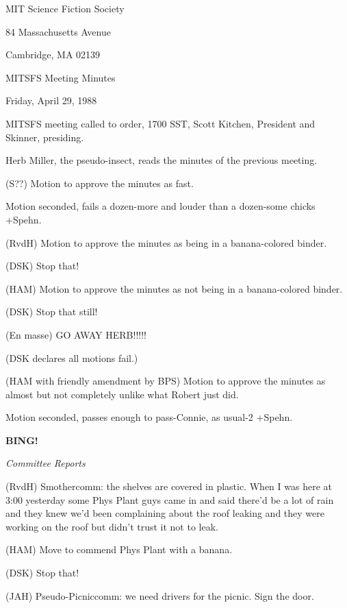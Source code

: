 \documentclass[12pt]{article}
\newcommand{\bing}{{\bf BING!} }
\newcommand{\goto}[1]{\bing \vskip 12pt \centerline{{\em{#1}}}}
\begin{document}
\begin{center}

MIT Science Fiction Society 

84 Massachusetts Avenue

Cambridge, MA 02139

\vspace{12pt}

MITSFS Meeting Minutes 

Friday, April 29, 1988

\end{center}
 
\vspace{18pt}

\setlength{\parskip}{6pt}

\noindent
MITSFS meeting called to order, 1700 SST,
Scott Kitchen, President and Skinner, presiding.

Herb Miller, the pseudo-insect, reads the minutes of the previous meeting.

(S??) Motion to approve the minutes as fast.

Motion seconded, fails a dozen-more and louder than a dozen-some chicks +Spehn.

(RvdH) Motion to approve the minutes as being in a banana-colored binder.

(DSK) Stop that!

(HAM) Motion to approve the minutes as not being in a banana-colored binder.

(DSK) Stop that still!

(En masse) GO AWAY HERB!!!!!

(DSK declares all motions fail.)

(HAM with friendly amendment by BPS) Motion to approve the minutes as almost but not completely unlike what Robert just did.

Motion seconded, passes enough to pass-Connie, as usual-2 +Spehn.

\goto{Committee Reports}

(RvdH) Smothercomm: the shelves are covered in plastic. When I was here at 3:00 yesterday some Phys Plant guys came in and said there'd be a lot of rain and they knew we'd been complaining about the roof leaking and they were working on the roof but didn't trust it not to leak.

(HAM) Move to commend Phys Plant with a banana.

(DSK) Stop that!

(JAH) Pseudo-Picniccomm: we need drivers for the picnic. Sign the door.
\end{document}
